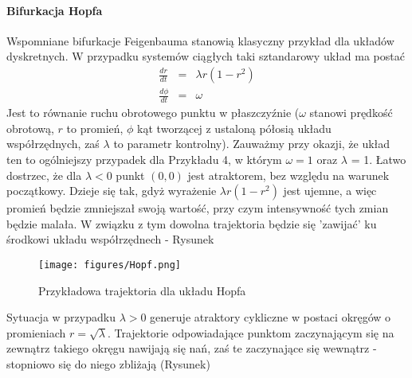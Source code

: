 \documentclass[12pt]{article}
\begin{document}
\paragraph{Bifurkacja Hopfa}
Wspomniane bifurkacje Feigenbauma stanowią klasyczny przykład dla układów dyskretnych. W przypadku systemów ciągłych taki sztandarowy układ ma postać
\begin{equation}
\begin{array}{rcl} 
\frac{dr}{dt} & = & \lambda r(1-r^2) \\ 
\frac{d\phi}{dt} & = & \omega
\end{array}
\end{equation}
Jest to równanie ruchu obrotowego punktu w płaszczyźnie ($ \omega $ stanowi prędkość obrotową, $ r $ to promień, $ \phi $ kąt tworzącej z ustaloną półosią układu współrzędnych, zaś $ \lambda  $ to parametr kontrolny). Zauważmy przy okazji, że układ ten to ogólniejszy przypadek dla Przykładu 4, w którym $ \omega = 1 $ oraz $ \lambda $ = 1.\newline
Łatwo dostrzec, że dla $ \lambda < 0 $ punkt $ (0,0) $ jest atraktorem, bez względu na warunek początkowy. Dzieje się tak, gdyż wyrażenie $ \lambda r(1-r^{2}) $ jest ujemne, a więc promień będzie zmniejszał swoją wartość, przy czym intensywność tych zmian będzie malała. W związku z tym dowolna trajektoria będzie się 'zawijać' ku środkowi układu współrzędnech - Rysunek
\begin{figure}[H]
	\texttt{[image: figures/Hopf.png]} 
	\centering
	\caption{Przykładowa trajektoria dla układu Hopfa}
\end{figure}
Sytuacja w przypadku $ \lambda >0 $ generuje atraktory cykliczne w postaci okręgów o promieniach $ r = \sqrt{\lambda} $. Trajektorie odpowiadające punktom zaczynającym się na zewnątrz takiego okręgu nawijają się nań, zaś te zaczynające się wewnątrz - stopniowo się do niego zbliżają (Rysunek)
\end{document}
